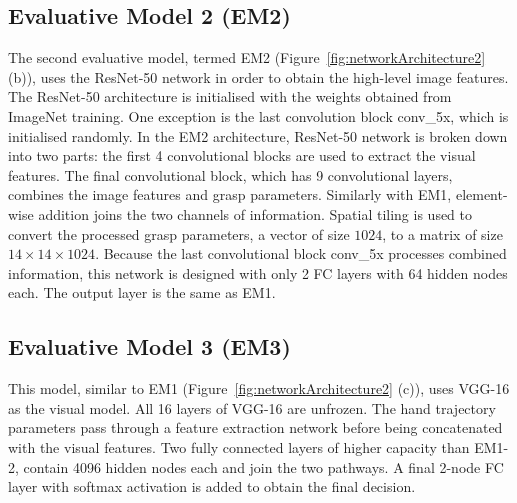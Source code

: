 \subsection{Evaluative Model 2 (EM2)}


The second evaluative model, termed EM2 (Figure~\ref{fig:networkArchitecture2} (b)), uses the ResNet-50 network in order to obtain the high-level image features. The ResNet-50 architecture is initialised with the weights obtained from ImageNet training. One exception is the last convolution block conv\_5x, which is initialised randomly. In the EM2 architecture, ResNet-50 network is broken down into two parts: the first 4 convolutional blocks are used to extract the visual features. The final convolutional block, which has 9 convolutional layers, combines the image features and grasp parameters. Similarly with EM1, element-wise addition joins the two channels of information. Spatial tiling is used to convert the processed grasp parameters, a vector of size $1024$, to a matrix of size $14 \times 14 \times 1024$. Because the last convolutional block conv\_5x processes combined information, this network is designed with only 2 FC layers with 64 hidden nodes each. The output layer is the same as EM1. 

\subsection{Evaluative Model 3 (EM3)}

This model, similar to EM1 (Figure~\ref{fig:networkArchitecture2} (c)), uses VGG-16 as the visual model. All 16 layers of VGG-16 are unfrozen. The hand trajectory parameters pass through a feature extraction network before being concatenated with the visual features. Two fully connected layers of higher capacity than EM1-2, contain 4096 hidden nodes each and join the two pathways. A final 2-node FC layer with softmax activation is added to obtain the final decision.

